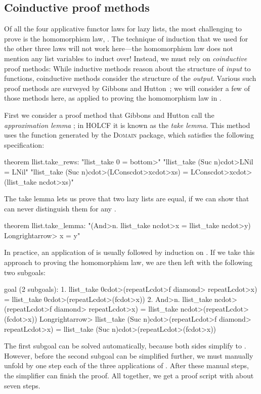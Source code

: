 \subsection{Coinductive proof methods}
\label{sec:case-coinductive}

Of all the four applicative functor laws for lazy lists, the most challenging to prove is the homomorphism law, . The technique of induction that we used for the other three laws will not work here---the homomorphism law does not mention any list variables to induct over! Instead, we must rely on \emph{coinductive} proof methods: While inductive methods reason about the structure of \emph{input} to functions, coinductive methods consider the structure of the \emph{output}. Various such proof methods are surveyed by Gibbons and Hutton~\cite{Gibbons2005}; we will consider a few of those methods here, as applied to proving the homomorphism law in .

First we consider a proof method that Gibbons and Hutton call the \emph{approximation lemma} \cite{Hutton01,Gibbons2005}; in HOLCF it is known as the \emph{take lemma}. This method uses the function  generated by the \textsc{Domain} package, which satisfies the following specification:
%
\begin{isacode}
theorem llist.take_rews:
  "llist_take 0 = \<bottom>"
  "llist_take (Suc n)\<cdot>LNil = LNil"
  "llist_take (Suc n)\<cdot>(LCons\<cdot>x\<cdot>xs) = LCons\<cdot>x\<cdot>(llist_take n\<cdot>xs)"
\end{isacode}
%
The take lemma lets us prove that two lazy lists are equal, if we can show that  can never distinguish them for any .
%
\begin{isacode}
theorem llist.take_lemma: "(\<And>n. llist_take n\<cdot>x = llist_take n\<cdot>y) \<Longrightarrow> x = y"
\end{isacode}
%
In practice, an application of  is usually followed by induction on . If we take this approach to proving the homomorphism law, we are then left with the following two subgoals:
%
\begin{isacode}
goal (2 subgoals):
 1. llist_take 0\<cdot>(repeatL\<cdot>f \<diamond> repeatL\<cdot>x) = llist_take 0\<cdot>(repeatL\<cdot>(f\<cdot>x))
 2. \<And>n. llist_take n\<cdot>(repeatL\<cdot>f \<diamond> repeatL\<cdot>x) = llist_take n\<cdot>(repeatL\<cdot>(f\<cdot>x)) \<Longrightarrow>
    llist_take (Suc n)\<cdot>(repeatL\<cdot>f \<diamond> repeatL\<cdot>x) = llist_take (Suc n)\<cdot>(repeatL\<cdot>(f\<cdot>x))
\end{isacode}
%
The first subgoal can be solved automatically, because both sides simplify to . However, before the second subgoal can be simplified further, we must manually unfold by one step each of the three applications of . After these manual steps, the simplifier can finish the proof. All together, we get a proof script with about seven steps.

